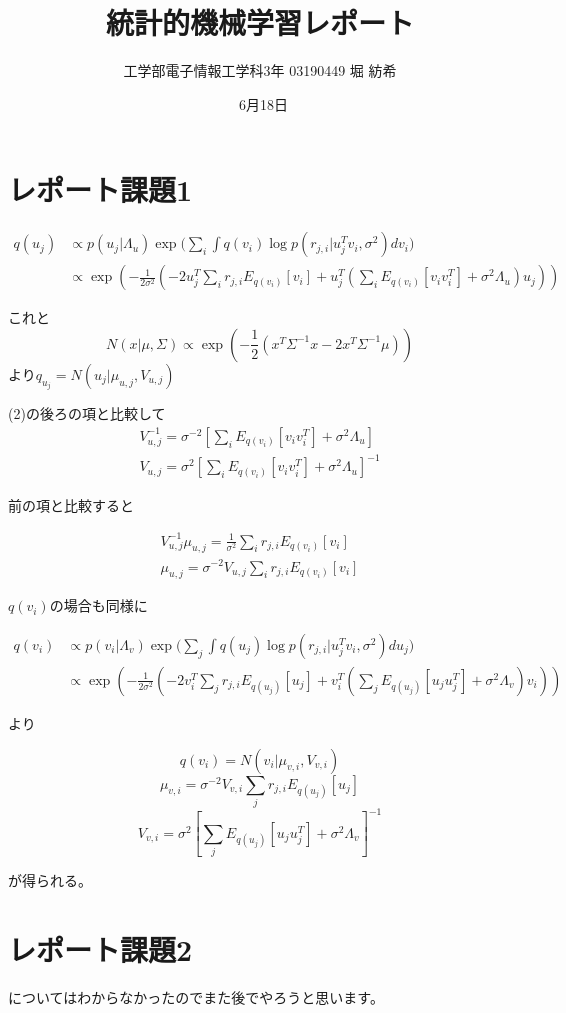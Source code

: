 \documentclass[dvipdfmx]{jsarticle}
\begin{document}
\title{統計的機械学習レポート}
\author{工学部電子情報工学科3年 03190449  堀 紡希}
\date{\ 6月18日}
\maketitle

\section{レポート課題1}

\begin{align}
q(u_{j})&\propto p(u_{j}|\Lambda_{u})\exp({\sum_{i}\int q(v_{i})\log{p(r_{j,i}|u_{j}^{T}v_{i}, \sigma ^{2})}dv_{i})}\\
&\propto \exp{(-\frac{1}{2\sigma^{2}}(-2u_{j}^{T}\sum_{i}r_{j,i}E_{q(v_{i})}[v_{i}]+u_{j}^{T}(\sum_{i}E_{q(v_{i})}[v_{i}v_{i}^{T}]+\sigma ^{2}\Lambda _{u})u_{j}))}
\end{align}

これと
\[ N(x|\mu ,\Sigma) \propto \exp{(-\frac{1}{2}(x^{T}\Sigma^{-1}x-2x^{T}\Sigma^{-1}\mu))}\]
より$q_{u_{j}} = N(u_{j}|\mu_{u, j}, V_{u, j})$

(2)の後ろの項と比較して
\begin{align*}
V_{u,j}^{-1} = \sigma^{-2}[\sum_{i}E_{q(v_{i})}[v_{i}v_{i}^{T}]+\sigma ^{2}\Lambda _{u}]\\
V_{u,j} = \sigma^{2}[\sum_{i}E_{q(v_{i})}[v_{i}v_{i}^{T}]+\sigma ^{2}\Lambda _{u}]^{-1}
\end{align*}

前の項と比較すると

\begin{align*}
V_{u,j}^{-1}\mu_{u,j} = \frac{1}{\sigma^{2}}\sum_{i}r_{j,i}E_{q(v_{i})}[v_{i}]\\
\mu_{u,j} = \sigma^{-2}V_{u,j}\sum_{i}r_{j,i}E_{q(v_{i})}[v_{i}]
\end{align*}




$q(v_{i})$の場合も同様に

\begin{align}
q(v_{i})&\propto p(v_{i}|\Lambda_{v})\exp({\sum_{j}\int q(u_{j})\log{p(r_{j,i}|u_{j}^{T}v_{i}, \sigma ^{2})}du_{j})}\\
&\propto \exp{(-\frac{1}{2\sigma^{2}}(-2v_{i}^{T}\sum_{j}r_{j,i}E_{q(u_{j})}[u_{j}]+v_{i}^{T}(\sum_{j}E_{q(u_{j})}[u_{j}u_{j}^{T}]+\sigma ^{2}\Lambda _{v})v_{i}))}
\end{align}

より
\newpage

\[q(v_{i}) = N(v_{i}|\mu_{v, i}, V_{v, i})\]
\[\mu_{v, i} = \sigma^{-2}V_{v, i}\sum_{j}r_{j, i}E_{q(u_{j})}[u_{j}]\]
\[V_{v, i} = \sigma^{2}[\sum_{j}E_{q(u_{j})}[u_{j}u_{j}^{T}]+\sigma^{2}\Lambda_{v}]^{-1}\]

が得られる。


\section{レポート課題2}

についてはわからなかったのでまた後でやろうと思います。
\end{document}
